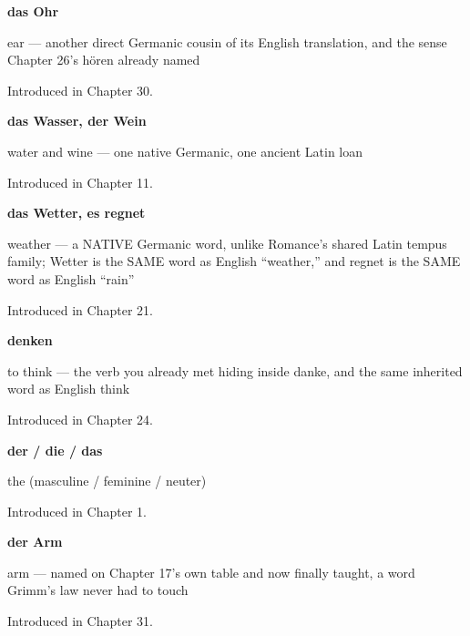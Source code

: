\noindent\begin{minipage}[t]{\linewidth}
\raggedright
\textbf{das Ohr}\par
\small ear — another direct Germanic cousin of its English translation, and the sense Chapter 26's hören already named\par
\footnotesize Introduced in Chapter 30.
\end{minipage}\par\medskip

\noindent\begin{minipage}[t]{\linewidth}
\raggedright
\textbf{das Wasser, der Wein}\par
\small water and wine — one native Germanic, one ancient Latin loan\par
\footnotesize Introduced in Chapter 11.
\end{minipage}\par\medskip

\noindent\begin{minipage}[t]{\linewidth}
\raggedright
\textbf{das Wetter, es regnet}\par
\small weather — a NATIVE Germanic word, unlike Romance's shared Latin tempus family; Wetter is the SAME word as English \textquotedblleft{}weather,\textquotedblright{} and regnet is the SAME word as English \textquotedblleft{}rain\textquotedblright{}\par
\footnotesize Introduced in Chapter 21.
\end{minipage}\par\medskip

\noindent\begin{minipage}[t]{\linewidth}
\raggedright
\textbf{denken}\par
\small to think — the verb you already met hiding inside danke, and the same inherited word as English think\par
\footnotesize Introduced in Chapter 24.
\end{minipage}\par\medskip

\noindent\begin{minipage}[t]{\linewidth}
\raggedright
\textbf{der / die / das}\par
\small the (masculine / feminine / neuter)\par
\footnotesize Introduced in Chapter 1.
\end{minipage}\par\medskip

\noindent\begin{minipage}[t]{\linewidth}
\raggedright
\textbf{der Arm}\par
\small arm — named on Chapter 17's own table and now finally taught, a word Grimm's law never had to touch\par
\footnotesize Introduced in Chapter 31.
\end{minipage}\par\medskip

